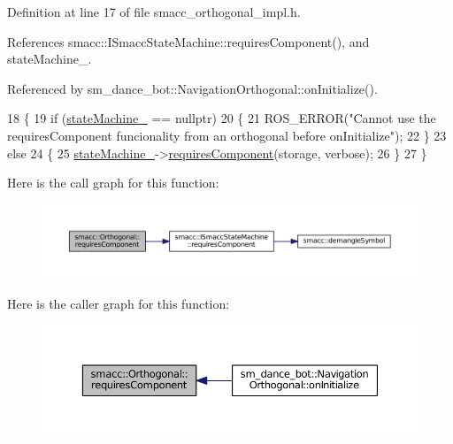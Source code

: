Definition at line 17 of file smacc\+\_\+orthogonal\+\_\+impl.\+h.



References smacc\+::\+I\+Smacc\+State\+Machine\+::requires\+Component(), and state\+Machine\+\_\+.



Referenced by sm\+\_\+dance\+\_\+bot\+::\+Navigation\+Orthogonal\+::on\+Initialize().


\begin{DoxyCode}
18 \{
19     \textcolor{keywordflow}{if} (\hyperlink{classsmacc_1_1Orthogonal_acea2058ac94667e46fc60ed3d4f524f7}{stateMachine\_} == \textcolor{keyword}{nullptr})
20     \{
21         ROS\_ERROR(\textcolor{stringliteral}{"Cannot use the requiresComponent funcionality from an orthogonal before onInitialize"});
22     \}
23     \textcolor{keywordflow}{else}
24     \{
25         \hyperlink{classsmacc_1_1Orthogonal_acea2058ac94667e46fc60ed3d4f524f7}{stateMachine\_}->\hyperlink{classsmacc_1_1ISmaccStateMachine_a729d0bcb3c4894e33f0696e0b1aeb155}{requiresComponent}(storage, verbose);
26     \}
27 \}
\end{DoxyCode}


Here is the call graph for this function\+:
\nopagebreak
\begin{figure}[H]
\begin{center}
\leavevmode
\includegraphics[width=350pt]{classsmacc_1_1Orthogonal_a098b5be0f89d0911afc44c10b756ef2a_cgraph}
\end{center}
\end{figure}




Here is the caller graph for this function\+:
\nopagebreak
\begin{figure}[H]
\begin{center}
\leavevmode
\includegraphics[width=350pt]{classsmacc_1_1Orthogonal_a098b5be0f89d0911afc44c10b756ef2a_icgraph}
\end{center}
\end{figure}


